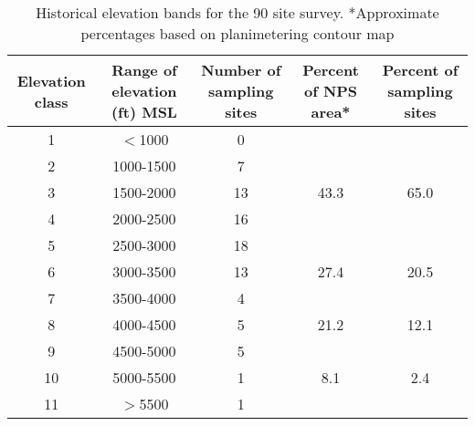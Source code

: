 \begin{table}[htbp]
\centering
\begin{tabular}{ccccc}
\toprule
Elevation class & \multicolumn{1}{p{3cm}}{Range of elevation (ft) MSL} & \multicolumn{1}{p{3cm}}{Number of sampling sites} & \multicolumn{1}{p{2cm}}{Percent of NPS area*} & \multicolumn{1}{p{2cm}}{Percent of sampling sites} \\ 
\midrule
1 & $<$1000 & 0 &  & \\ 
2 & 1000-1500 & 7 & &  \\ 
3 & 1500-2000 & 13 &43.3 &65.0  \\ 
4 & 2000-2500 & 16 &  &  \\ 
5 & 2500-3000 & 18 & &  \\ \midrule
6 & 3000-3500 & 13 & 27.4 & 20.5 \\ 
7 & 3500-4000 & 4 & & \\ \midrule
8 & 4000-4500 & 5 & 21.2 & 12.1 \\ 
9 & 4500-5000 & 5 & &  \\ \midrule
10 & 5000-5500 & 1 &8.1 & 2.4 \\ 
11 & $>$5500 & 1 & &  \\ 
\bottomrule
\end{tabular}
\caption{Historical elevation bands for the 90 site survey. *Approximate percentages based on planimetering contour map}
\label{tab:Odomtable}
\end{table}
